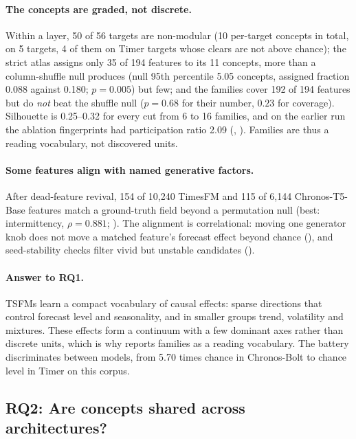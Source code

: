\paragraph{The concepts are graded, not discrete.} Within a layer, 50 of 56 targets are non-modular (10 per-target
concepts in total, on 5 targets, 4 of them on Timer targets whose clears are not above chance); the strict atlas assigns
only 35 of 194 features to its 11 concepts, more than a column-shuffle null produces (null 95th percentile 5.05 concepts,
assigned fraction 0.088 against 0.180; $p=0.005$) but few; and the families cover 192 of 194 features but do \emph{not}
beat the shuffle null ($p=0.68$ for their number, $0.23$ for coverage). Silhouette is 0.25--0.32 for every cut from 6 to
16 families, and on the earlier run the ablation fingerprints had participation ratio 2.09 (, ).
Families are thus a reading vocabulary, not discovered units.

\paragraph{Some features align with named generative factors.} After dead-feature revival, 154 of 10{,}240
TimesFM and 115 of 6{,}144 Chronos-T5-Base features match a ground-truth field beyond a permutation null (best:
intermittency, $\rho=0.881$; ). The alignment is correlational: moving one generator knob does not move a
matched feature's forecast effect beyond chance (), and seed-stability checks filter vivid but unstable
candidates ().

\paragraph{Answer to RQ1.} TSFMs learn a compact vocabulary of causal effects: sparse directions that control forecast
level and seasonality, and in smaller groups trend, volatility and mixtures. These effects form a continuum with a few
dominant axes rather than discrete units, which is why \tool{} reports families as a reading vocabulary. The battery
discriminates between models, from 5.70 times chance in Chronos-Bolt to chance level in Timer on this corpus.

\subsection{RQ2: Are concepts shared across architectures?}
\label{sec:rq2}

